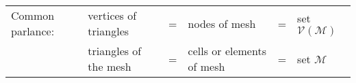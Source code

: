 \begin{mdframed}[linecolor=orange,linewidth=.5pt,roundcorner=10pt]
	\begin{tabular}{llllll}
	 Common parlance: & vertices of triangles & = & nodes of mesh
			 & = & set $\mathcal{V}(\mathcal{M})$\\
	  				  & triangles of the mesh & = & cells or elements of mesh
			 & = & set $\mathcal{M}$
	\end{tabular}
\end{mdframed}